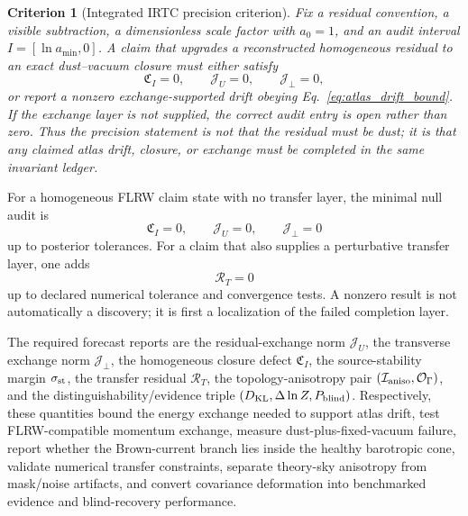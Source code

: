 \documentclass[
  aps,
  prd,
  reprint,
  superscriptaddress,
  floatfix,
  nofootinbib,
  longbibliography
]{revtex4-2}
\theoremstyle{plain}
\newtheorem{criterion}[theorem]{Criterion}
\theoremstyle{definition}
\theoremstyle{remark}
\newcommand{\KL}{\operatorname{KL}}
\newcommand{\Ical}{\mathcal I}
\newcommand{\Ocal}{\mathcal O}
\newcommand{\Jcal}{\mathcal J}
\begin{document}
\begin{criterion}[Integrated IRTC precision criterion]
Fix a residual convention, a visible subtraction, a dimensionless scale factor with $a_0=1$, and an audit interval $I=[\ln a_{\min},0]$.  A claim that upgrades a reconstructed homogeneous residual to an exact dust--vacuum closure must either satisfy
\begin{equation}
\mathfrak C_I=0,
\qquad
\Jcal_U=0,
\qquad
\Jcal_\perp=0,
\label{eq:precision_null}
\end{equation}
or report a nonzero exchange-supported drift obeying Eq.~\eqref{eq:atlas_drift_bound}.  If the exchange layer is not supplied, the correct audit entry is open rather than zero.  Thus the precision statement is not that the residual must be dust; it is that any claimed atlas drift, closure, or exchange must be completed in the same invariant ledger.
\label{crit:integrated_precision}
\end{criterion}

For a homogeneous FLRW claim state with no transfer layer, the minimal null audit is
\begin{equation}
\boxed{
\mathfrak C_I=0,
\qquad
\Jcal_U=0,
\qquad
\Jcal_\perp=0
}
\label{eq:null_audit_core}
\end{equation}
up to posterior tolerances.  For a claim that also supplies a perturbative transfer layer, one adds
\begin{equation}
\boxed{\mathcal R_T=0}
\label{eq:transfer_null_audit}
\end{equation}
up to declared numerical tolerance and convergence tests.  A nonzero result is not automatically a discovery; it is first a localization of the failed completion layer.


The required forecast reports are the residual-exchange norm $\Jcal_U$, the transverse exchange norm $\Jcal_\perp$, the homogeneous closure defect $\mathfrak C_I$, the source-stability margin $\sigma_{\rm st}$, the transfer residual $\mathcal R_T$, the topology-anisotropy pair $(\Ical_{\rm aniso},\Ocal_\Gamma)$, and the distinguishability/evidence triple $(D_{\KL},\Delta\ln Z,P_{\rm blind})$.  Respectively, these quantities bound the energy exchange needed to support atlas drift, test FLRW-compatible momentum exchange, measure dust-plus-fixed-vacuum failure, report whether the Brown-current branch lies inside the healthy barotropic cone, validate numerical transfer constraints, separate theory-sky anisotropy from mask/noise artifacts, and convert covariance deformation into benchmarked evidence and blind-recovery performance.
\end{document}
